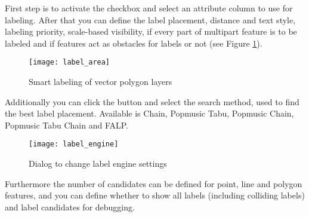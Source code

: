 
First step is to activate the  checkbox and select an attribute
column to use for labeling. After that you can define the label placement, distance and text 
style, labeling priority, scale-based visibility, if every part of multipart feature is to be
labeled and if features act as obstacles for labels or not (see Figure \ref{fig:arealabel}).

\begin{figure}[ht]
\centering
   \texttt{[image: label\_area]}
   \caption{Smart labeling of vector polygon layers \nixcaption}\label{fig:arealabel}
\end{figure}


Additionally you can click the  button and select the search method, 
used to find the best label placement. Available is Chain, Popmusic Tabu, Popmusic Chain, 
Popmusic Tabu Chain and FALP.  

\begin{figure}[ht]
\centering
   \texttt{[image: label\_engine]}
   \caption{Dialog to change label engine settings \nixcaption}\label{fig:labelengine}
\end{figure}

Furthermore the number of candidates can be defined for point, line and polygon features, 
and you can define whether to show all labels (including colliding labels) and label 
candidates for debugging.

\FloatBarrier


